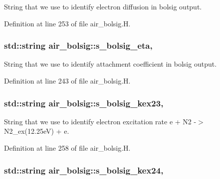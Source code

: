 String that we use to identify electron diffusion in bolsig output. 



Definition at line 253 of file air\+\_\+bolsig.\+H.

\subsubsection[{\texorpdfstring{s\+\_\+bolsig\+\_\+eta}{s_bolsig_eta}}]{\setlength{\rightskip}{0pt plus 5cm}std\+::string air\+\_\+bolsig\+::s\+\_\+bolsig\+\_\+eta\hspace{0.3cm}{\ttfamily [static]}, {\ttfamily [protected]}}\hypertarget{classair__bolsig_a674655e420372d7cb17dc55f0c4ed67a}{}\label{classair__bolsig_a674655e420372d7cb17dc55f0c4ed67a}


String that we use to identify attachment coefficient in bolsig output. 



Definition at line 243 of file air\+\_\+bolsig.\+H.

\subsubsection[{\texorpdfstring{s\+\_\+bolsig\+\_\+kex23}{s_bolsig_kex23}}]{\setlength{\rightskip}{0pt plus 5cm}std\+::string air\+\_\+bolsig\+::s\+\_\+bolsig\+\_\+kex23\hspace{0.3cm}{\ttfamily [static]}, {\ttfamily [protected]}}\hypertarget{classair__bolsig_a3359df8c594a3b6de6de15f2020b6f21}{}\label{classair__bolsig_a3359df8c594a3b6de6de15f2020b6f21}


String that we use to identify electron excitation rate e + N2 -\/$>$ N2\+\_\+ex(12.\+25eV) + e. 



Definition at line 258 of file air\+\_\+bolsig.\+H.

\subsubsection[{\texorpdfstring{s\+\_\+bolsig\+\_\+kex24}{s_bolsig_kex24}}]{\setlength{\rightskip}{0pt plus 5cm}std\+::string air\+\_\+bolsig\+::s\+\_\+bolsig\+\_\+kex24\hspace{0.3cm}{\ttfamily [static]}, {\ttfamily [protected]}}\hypertarget{classair__bolsig_a493139d168bd72fd215199ffdeb019f0}{}\label{classair__bolsig_a493139d168bd72fd215199ffdeb019f0}


